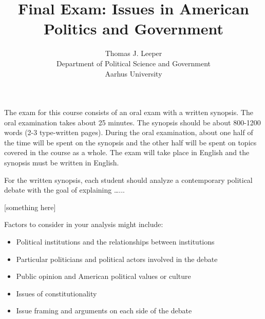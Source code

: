 \documentclass[12pt,a4paper]{article}
\title{Final Exam: Issues in American Politics and Government}
\author{Thomas J. Leeper\\
Department of Political Science and Government\\
Aarhus University}
\begin{document}
\maketitle

The exam for this course consists of an oral exam with a written synopsis. The oral examination takes about 25 minutes. The synopsis should be about 800-1200 words (2-3 type-written pages). During the oral examination, about one half of the time will be spent on the synopsis and the other half will be spent on topics covered in the course as a whole. The exam will take place in English and the synopsis must be written in English.

For the written synopsis, each student should analyze a contemporary political debate with the goal of explaining \dots...

[something here]

Factors to consider in your analysis might include:

\begin{itemize}
\item Political institutions and the relationships between institutions
\item Particular politicians and political actors involved in the debate
\item Public opinion and American political values or culture
\item Issues of constitutionality
\item Issue framing and arguments on each side of the debate
\end{itemize}
\end{document}
